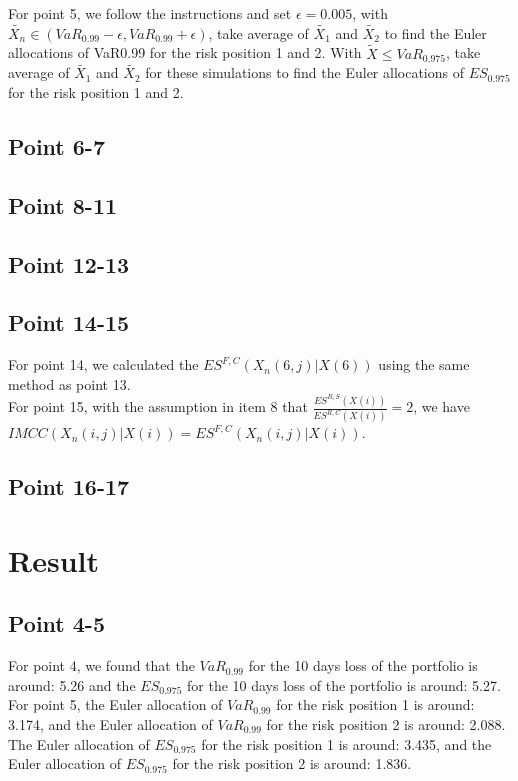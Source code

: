 \documentclass{article}
\begin{document}
\noindent For point 5, we follow the instructions and set $\epsilon = 0.005$, with $\tilde {X_n} \in (VaR_{0.99} - \epsilon, VaR_{0.99} + \epsilon)$, take average of $\tilde {X_1}$ and $\tilde {X_2}$ to find the Euler allocations of
VaR0.99 for the risk position 1 and 2.
With $\tilde {X} \leq VaR_{0.975}$,  take average of $\tilde {X_1}$ and $\tilde {X_2}$ for these simulations to find the Euler allocations of $ES_{0.975}$ for the risk position 1 and 2.
\subsection*{Point 6-7}
\subsection*{Point 8-11}
\subsection*{Point 12-13}
\subsection*{Point 14-15}
For point 14, we calculated the $ES^{F,C}(X_n(6,j)|X(6))$ using the same method as point 13.
\\For point 15, with the assumption in item 8 that $\frac {ES^{R,S}(X(i))} {ES^{R,C}(X(i))} = 2$, we have $IMCC(X_n(i,j)|X(i))=ES^{F,C}(X_n(i,j)|X(i))$.
\subsection*{Point 16-17}
\section*{Result}

\subsection*{Point 4-5}
For point 4, we found that the $VaR_{0.99}$ for the 10 days loss of the portfolio is around: 5.26 and the $ES_{0.975}$ for the 10 days loss of the portfolio is around: 5.27.
\\For point 5, the Euler allocation of $VaR_{0.99}$ for the risk position 1 is around: 3.174, and the Euler allocation of $VaR_{0.99}$ for the risk position 2 is around: 2.088. The Euler allocation of $ES_{0.975}$ for the risk position 1 is around: 3.435, and the Euler allocation of $ES_{0.975}$ for the risk position 2 is around: 1.836.
\end{document}
